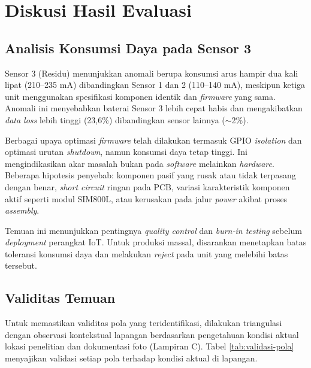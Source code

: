\section{Diskusi Hasil Evaluasi}
\label{sec:diskusi-evaluasi}

\subsection{Analisis Konsumsi Daya pada Sensor 3}

Sensor 3 (Residu) menunjukkan anomali berupa konsumsi arus hampir dua kali lipat (210--235 mA) dibandingkan Sensor 1 dan 2 (110--140 mA), meskipun ketiga unit menggunakan spesifikasi komponen identik dan \textit{firmware} yang sama. Anomali ini menyebabkan baterai Sensor 3 lebih cepat habis dan mengakibatkan \textit{data loss} lebih tinggi (23,6\%) dibandingkan sensor lainnya ($\sim$2\%).

Berbagai upaya optimasi \textit{firmware} telah dilakukan termasuk GPIO \textit{isolation} dan optimasi urutan \textit{shutdown}, namun konsumsi daya tetap tinggi. Ini mengindikasikan akar masalah bukan pada \textit{software} melainkan \textit{hardware}. Beberapa hipotesis penyebab: komponen pasif yang rusak atau tidak terpasang dengan benar, \textit{short circuit} ringan pada PCB, variasi karakteristik komponen aktif seperti modul SIM800L, atau kerusakan pada jalur \textit{power} akibat proses \textit{assembly}.

Temuan ini menunjukkan pentingnya \textit{quality control} dan \textit{burn-in testing} sebelum \textit{deployment} perangkat IoT. Untuk produksi massal, disarankan menetapkan batas toleransi konsumsi daya dan melakukan \textit{reject} pada unit yang melebihi batas tersebut.

\subsection{Validitas Temuan}

Untuk memastikan validitas pola yang teridentifikasi, dilakukan triangulasi dengan observasi kontekstual lapangan berdasarkan pengetahuan kondisi aktual lokasi penelitian dan dokumentasi foto (Lampiran C). Tabel \ref{tab:validasi-pola} menyajikan validasi setiap pola terhadap kondisi aktual di lapangan.

